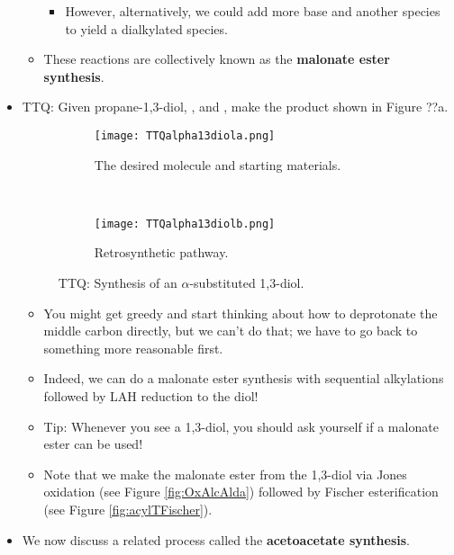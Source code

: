 \documentclass[../notes.tex]{subfiles}
\begin{document}
\begin{itemize}
\begin{itemize}
\begin{itemize}
            \item However, alternatively, we could add more base and another  species to yield a dialkylated species.
        \end{itemize}
        \item These reactions are collectively known as the \textbf{malonate ester synthesis}.
    \end{itemize}
    \item TTQ: Given propane-1,3-diol, , and , make the product shown in Figure ??a.
    \begin{figure}[h!]
        \centering
        \begin{subfigure}[b]{\linewidth}
            \centering
            \texttt{[image: TTQalpha13diola.png]}
            \caption{The desired molecule and starting materials.}
            \label{fig:TTQalpha13diola}
        \end{subfigure}\\[2em]
        \begin{subfigure}[b]{\linewidth}
            \centering
            \texttt{[image: TTQalpha13diolb.png]}
            \caption{Retrosynthetic pathway.}
            \label{fig:TTQalpha13diolb}
        \end{subfigure}
        \caption{TTQ: Synthesis of an $\alpha$-substituted 1,3-diol.}
        \label{fig:TTQalpha13diol}
    \end{figure}
    \begin{itemize}
        \item You might get greedy and start thinking about how to deprotonate the middle carbon directly, but we can't do that; we have to go back to something more reasonable first.
        \item Indeed, we can do a malonate ester synthesis with sequential alkylations followed by LAH reduction to the diol!
        \item Tip: Whenever you see a 1,3-diol, you should ask yourself if a malonate ester can be used!
        \item Note that we make the malonate ester from the 1,3-diol via Jones oxidation (see Figure \ref{fig:OxAlcAlda}) followed by Fischer esterification (see Figure \ref{fig:acylTFischer}).
    \end{itemize}
    \item We now discuss a related process called the \textbf{acetoacetate synthesis}.
    \begin{figure}[h!]

\end{figure}
\end{itemize}
\end{document}
